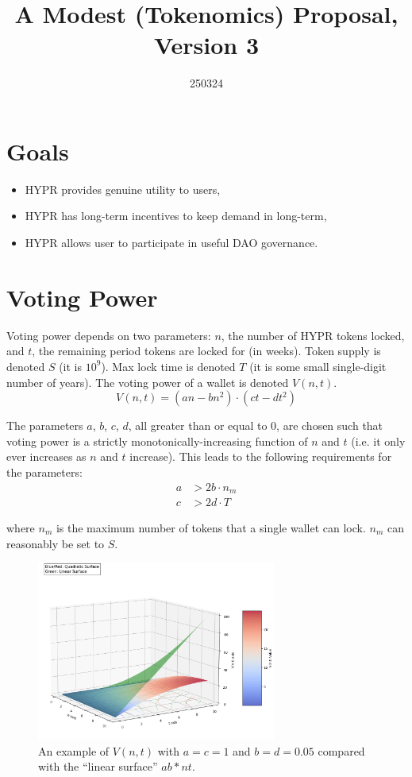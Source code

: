 \documentclass{article}
\title{A Modest (Tokenomics) Proposal, Version 3}
\date{250324}
\author{}
\begin{document}
\maketitle

\section{Goals}\label{sec:goals}
\begin{itemize}
    \item HYPR provides genuine utility to users,
    \item HYPR has long-term incentives to keep demand in long-term,
    \item HYPR allows user to participate in useful DAO governance.
\end{itemize}

\section{Voting Power}\label{sec:votingpower}

Voting power depends on two parameters: $n$, the number of HYPR tokens locked, and $t$, the remaining period tokens are locked for (in weeks).
Token supply is denoted $S$ (it is $10^9$).
Max lock time is denoted $T$ (it is some small single-digit number of years).
The voting power of a wallet is denoted $V(n, t)$.
\begin{equation}
V(n, t) = (an - bn^2) \cdot (ct - dt^2)
\end{equation}

The parameters $a$, $b$, $c$, $d$, all greater than or equal to $0$, are chosen such that voting power is a strictly monotonically-increasing function of $n$ and $t$ (i.e. it only ever increases as $n$ and $t$ increase).
This leads to the following requirements for the parameters:
\begin{align}
a &> 2b \cdot n_m\\
c &> 2d \cdot T
\end{align}

where $n_m$ is the maximum number of tokens that a single wallet can lock.
$n_m$ can reasonably be set to $S$.

\begin{figure}[h]
    \centering
    \includegraphics[width=0.7\textwidth]{voting-power-surface.png}
    \caption{An example of $V(n, t)$ with $a = c = 1$ and $b = d = 0.05$ compared with the ``linear surface'' $ab * nt$.}
    \label{fig:example-image}
\end{figure}
\end{document}

